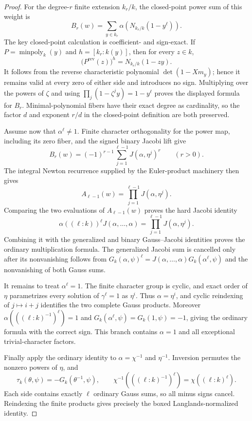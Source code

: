 \begin{proof}
For the degree-$r$ finite extension $k_r/k$, the closed-point power sum of
this weight is
\[
 B_r(w)=\sum_{y\in k_r}
   \alpha\!\left(N_{k_r/k}(1-y^\ell)\right).
\]
The key closed-point calculation is coefficient- and sign-exact.  If
$P=\operatorname{minpoly}_k(y)$ and $h=[k_r:k(y)]$, then for every
$z\in k$,
\[
 \bigl(P^{\mathrm{rev}}(z)\bigr)^h
 =N_{k_r/k}(1-zy).
\]
It follows from the reverse characteristic polynomial
$\det(1-Xm_y)$; hence it remains valid at every zero of either side and
introduces no sign.  Multiplying over the powers of $\zeta$ and using
$\prod_j(1-\zeta^jy)=1-y^\ell$ proves the displayed formula for $B_r$.
Minimal-polynomial fibers have their exact degree as cardinality, so the
factor $d$ and exponent $r/d$ in the closed-point definition are both
preserved.

Assume now that $\alpha^\ell\ne1$.  Finite character orthogonality for the
power map, including its zero fiber, and the signed binary Jacobi lift give
\[
 B_r(w)=(-1)^{r-1}
   \sum_{j=1}^{\ell-1}J(\alpha,\eta^j)^r
 \qquad(r>0).
\]
The integral Newton recurrence supplied by the Euler-product machinery
then gives
\[
 A_{\ell-1}(w)=
   \prod_{j=1}^{\ell-1}J(\alpha,\eta^j).
\]
Comparing the two evaluations of $A_{\ell-1}(w)$ proves the hard Jacobi
identity
\[
 \alpha((\ell:k))^\ell
 J(\alpha,\ldots,\alpha)
 =\prod_{j=1}^{\ell-1}J(\alpha,\eta^j).
\]
Combining it with the generalized and binary Gauss--Jacobi identities
proves the ordinary multiplication formula.  The generalized Jacobi sum
is cancelled only after its nonvanishing follows from
$G_k(\alpha,\psi)^\ell
=J(\alpha,\ldots,\alpha)G_k(\alpha^\ell,\psi)$ and the nonvanishing of
both Gauss sums.

It remains to treat $\alpha^\ell=1$.  The finite character group is cyclic,
and exact order of $\eta$ parametrizes every solution of
$\gamma^\ell=1$ as $\eta^i$.  Thus $\alpha=\eta^i$, and cyclic reindexing
of $j\mapsto i+j$ identifies the two complete Gauss products.  Moreover
$\alpha(((\ell:k)^{-1})^\ell)=1$ and
$G_k(\alpha^\ell,\psi)=G_k(1,\psi)=-1$, giving the ordinary formula with
the correct sign.  This branch contains $\alpha=1$ and all exceptional
trivial-character factors.

Finally apply the ordinary identity to $\alpha=\chi^{-1}$ and
$\eta^{-1}$.  Inversion permutes the nonzero powers of $\eta$, and
\[
 \tau_k(\theta,\psi)=-G_k(\theta^{-1},\psi),
 \qquad
 \chi^{-1}\!\left(((\ell:k)^{-1})^\ell\right)
 =\chi\!\left((\ell:k)^\ell\right).
\]
Each side contains exactly $\ell$ ordinary Gauss sums, so all minus signs
cancel.  Reindexing the finite products gives precisely the boxed
Langlands-normalized identity.
\end{proof}
